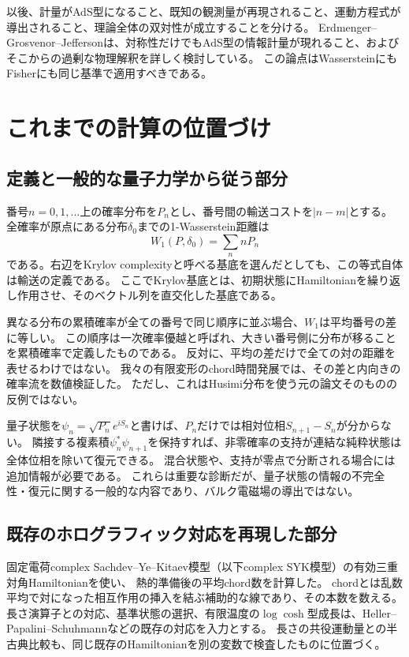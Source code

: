 \documentclass[a4paper,11pt]{ltjsarticle}
\numberwithin{equation}{section}
\begin{document}
以後、計量がAdS型になること、既知の観測量が再現されること、運動方程式が導出されること、理論全体の双対性が成立することを分ける。
Erdmenger--Grosvenor--Jeffersonは、対称性だけでもAdS型の情報計量が現れること、およびそこからの過剰な物理解釈を詳しく検討している\cite{EGJ}。
この論点はWassersteinにもFisherにも同じ基準で適用すべきである。

\section{これまでの計算の位置づけ}
\subsection{定義と一般的な量子力学から従う部分}
番号$n=0,1,\ldots$上の確率分布を$P_n$とし、番号間の輸送コストを$|n-m|$とする。
全確率が原点にある分布$\delta_0$までの1-Wasserstein距離は
\begin{equation}
 W_1(P,\delta_0)=\sum_n nP_n
 \label{eq:delta}
\end{equation}
である。右辺をKrylov complexityと呼べる基底を選んだとしても、この等式自体は輸送の定義である。
ここでKrylov基底とは、初期状態にHamiltonianを繰り返し作用させ、そのベクトル列を直交化した基底である。

異なる分布の累積確率が全ての番号で同じ順序に並ぶ場合、$W_1$は平均番号の差に等しい。
この順序は一次確率優越と呼ばれ、大きい番号側に分布が移ることを累積確率で定義したものである。
反対に、平均の差だけで全ての対の距離を表せるわけではない。
我々の有限変形のchord時間発展では、その差と内向きの確率流を数値検証した。
ただし、これはHusimi分布を使う元の論文そのものの反例ではない。

量子状態を$\psi_n=\sqrt{P_n}e^{iS_n}$と書けば、$P_n$だけでは相対位相$S_{n+1}-S_n$が分からない。
隣接する複素積$\psi_n^*\psi_{n+1}$を保持すれば、非零確率の支持が連結な純粋状態は全体位相を除いて復元できる。
混合状態や、支持が零点で分断される場合には追加情報が必要である。
これらは重要な診断だが、量子状態の情報の不完全性・復元に関する一般的な内容であり、バルク電磁場の導出ではない。

\subsection{既存のホログラフィック対応を再現した部分}
固定電荷complex Sachdev--Ye--Kitaev模型（以下complex SYK模型）の有効三重対角Hamiltonianを使い、
熱的準備後の平均chord数を計算した\cite{FKN}。
chordとは乱数平均で対になった相互作用の挿入を結ぶ補助的な線であり、その本数を数える。
長さ演算子との対応、基準状態の選択、有限温度の$\log\cosh$型成長は、Heller--Papalini--Schuhmannなどの既存の対応を入力とする\cite{HPS}。
長さの共役運動量との半古典比較も、同じ既存のHamiltonianを別の変数で検査したものに位置づく。
\end{document}

